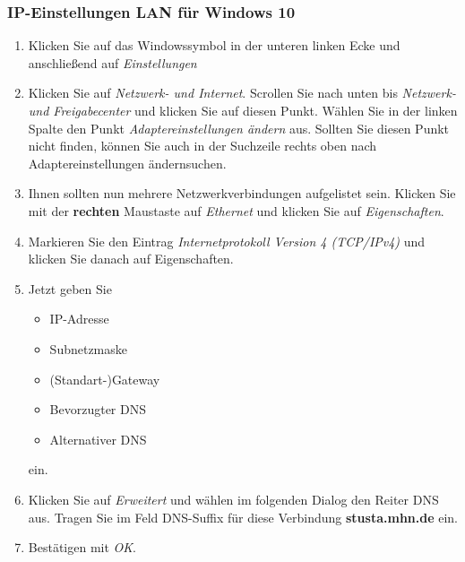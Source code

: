 \documentclass[a4paper,12pt]{scrartcl}
\begin{document}
\subsubsection*{IP-Einstellungen LAN für Windows 10}
\begin{minipage}{0.57\textwidth}
\begin{enumerate}
	\item Klicken Sie auf das Windowssymbol in der unteren linken Ecke und anschließend auf \emph{Einstellungen}
	\item Klicken Sie auf \textit{Netzwerk- und Internet}.
	Scrollen Sie nach unten bis \textit{Netzwerk- und Freigabecenter} und klicken Sie auf diesen Punkt. Wählen Sie in der linken Spalte den Punkt \textit{Adaptereinstellungen ändern} aus.
	Sollten Sie diesen Punkt nicht finden, können Sie auch in der Suchzeile rechts oben nach \glqq Adaptereinstellungen ändern\grqq suchen.
    \item Ihnen sollten nun mehrere Netzwerkverbindungen aufgelistet sein. Klicken Sie mit der \textbf{rechten} Maustaste auf \textit{Ethernet} und klicken Sie auf \textit{Eigenschaften}.
    \item Markieren Sie den Eintrag \textit{Internetprotokoll Version 4 (TCP/IPv4)} und klicken Sie danach auf Eigenschaften.
    \item Jetzt geben Sie
    \begin{itemize}
    	\item IP-Adresse
    	\item Subnetzmaske
    	\item (Standart-)Gateway
    	\item Bevorzugter DNS
    	\item Alternativer DNS
    \end{itemize}
	ein.
    \item Klicken Sie auf \textit{Erweitert} und wählen im folgenden Dialog den Reiter DNS aus. Tragen Sie im Feld DNS-Suffix für diese Verbindung \textbf{stusta.mhn.de} ein.
    \item Bestätigen mit \textit{OK}.
\end{enumerate}
\end{minipage}
\hfill
\end{document}

